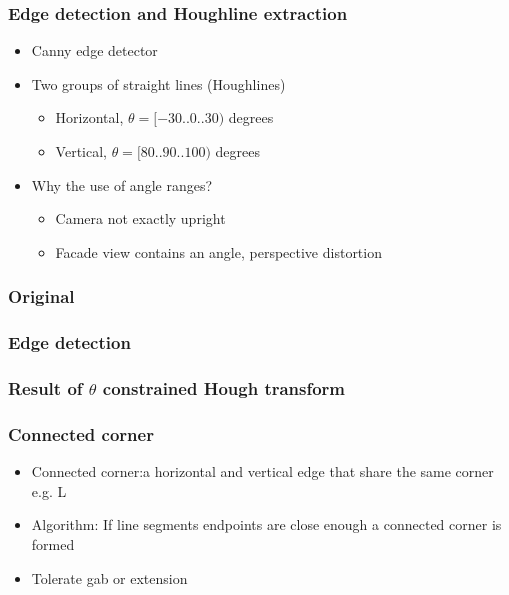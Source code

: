 \documentclass{beamer}
\begin{document}
\frame
{
	\frametitle{Edge detection and Houghline extraction}
	\begin{itemize}
	\item <+-| alert@+> Canny edge detector
	\item <+-| alert@+> Two groups of straight lines (Houghlines)
	\begin{itemize}
		\item <+-| alert@+> Horizontal, $\theta = [-30..0..30)$ degrees
		\item <+-| alert@+> Vertical, $\theta = [80..90..100)$ degrees
	\end{itemize}
	\item <+-| alert@+> Why the use of angle ranges?
	\begin{itemize}
		\item <+-| alert@+> Camera not exactly upright
		\item <+-| alert@+> Facade view contains an angle, perspective distortion 
	\end{itemize}
	\end{itemize}

}

\frame
{
	\frametitle{Original}
}

\frame
{
	\frametitle{Edge detection}
}

\frame
{
	\frametitle{Result of $\theta$ constrained Hough transform}
}

\frame
{
	\frametitle{Connected corner}
	\begin{itemize}
	\item <+-| alert@+> Connected corner:a horizontal and vertical edge that share the same
	corner e.g. L
	\item <+-| alert@+> Algorithm: If line segments endpoints are close enough a connected corner is formed
	\item <+-| alert@+> Tolerate gab or extension
	\end{itemize}
}
\end{document}
